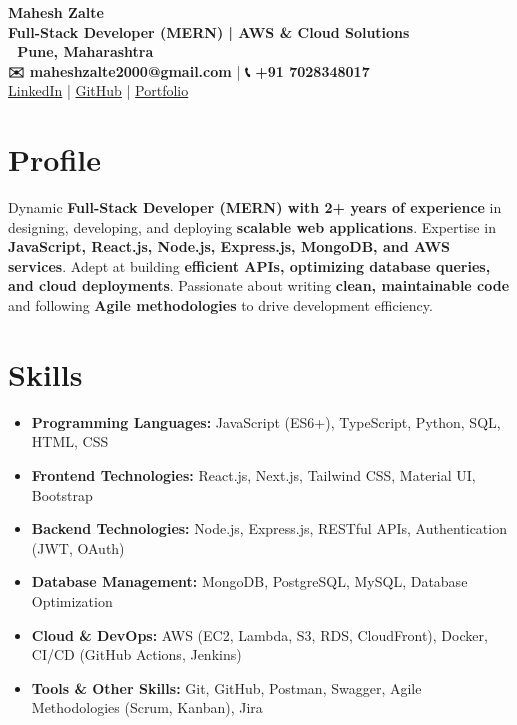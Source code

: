 \documentclass[a4paper,10pt]{article}
\begin{document}
\begin{center}
    {\Huge \textbf{Mahesh Zalte}} \\
    {\large \textbf{Full-Stack Developer (MERN) | AWS \& Cloud Solutions}} \\
    \textbf{📍 Pune, Maharashtra} \\
    \textbf{✉️ maheshzalte2000@gmail.com} | \textbf{📞 +91 7028348017} \\
    \href{https://linkedin.com/in/maheshzalte2000}{LinkedIn} | \href{https://github.com/zaltemahesh7}{GitHub} | \href{https://maheshzalte.netlify.app}{Portfolio}
\end{center}

\section*{Profile}
Dynamic \textbf{Full-Stack Developer (MERN) with 2+ years of experience} in designing, developing, and deploying \textbf{scalable web applications}. Expertise in \textbf{JavaScript, React.js, Node.js, Express.js, MongoDB, and AWS services}. Adept at building \textbf{efficient APIs, optimizing database queries, and cloud deployments}. Passionate about writing \textbf{clean, maintainable code} and following \textbf{Agile methodologies} to drive development efficiency.

\section*{Skills}
\begin{itemize}
    \item \textbf{Programming Languages:} JavaScript (ES6+), TypeScript, Python, SQL, HTML, CSS
    \item \textbf{Frontend Technologies:} React.js, Next.js, Tailwind CSS, Material UI, Bootstrap
    \item \textbf{Backend Technologies:} Node.js, Express.js, RESTful APIs, Authentication (JWT, OAuth)
    \item \textbf{Database Management:} MongoDB, PostgreSQL, MySQL, Database Optimization
    \item \textbf{Cloud \& DevOps:} AWS (EC2, Lambda, S3, RDS, CloudFront), Docker, CI/CD (GitHub Actions, Jenkins)
    \item \textbf{Tools \& Other Skills:} Git, GitHub, Postman, Swagger, Agile Methodologies (Scrum, Kanban), Jira
\end{itemize}
\end{document}
